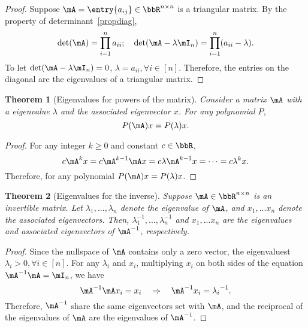 \documentclass[11pt]{article}
\theoremstyle{plain}
\newtheorem{thm}{Theorem}[section]
\theoremstyle{definition}
\begin{document}
\begin{proof}
Suppose $\mA = \entry{a_{ij}} \in \bbR^{n \times n}$ is a triangular matrix. By the property of determinant~\ref{propdiag}, 
\[ \det(\mA) = \prod_{i=1}^n a_{ii}  ; \quad \det(\mA - \lambda \mI_n) = \prod_{i=1}^n (a_{ii}-\lambda). \]
To let $\det(\mA - \lambda \mI_n) = 0$, $\lambda = a_{ii}, \forall i\in[n]$. Therefore, the entries on the diagonal are the eigenvalues of a triangular matrix.
\end{proof}

\begin{thm}[Eigenvalues for powers of the matrix]
	Consider a matrix $\mA$ with a eigenvalue $\lambda$ and the associated eigenvector $x$. For any polynomial $P$, 
	\[ P(\mA) x = P(\lambda) x. \]
\end{thm}
\begin{proof}
	For any integer $k \geq 0$ and constant $c \in \bbR$,
	\[ c\mA^k x = c\mA^{k-1} \mA x= c\lambda \mA^{k-1} x = \cdots = c\lambda^k x.\]
	Therefore, for any polynomial $P(\mA)x = P(\lambda)x$.
\end{proof}

\begin{thm}[Eigenvalues for the inverse]
Suppose $\mA \in \bbR^{n \times n}$ is an invertible matrix. Let $\lambda_1,...,\lambda_n$ denote the eigenvalue of $\mA$, and $x_1,...x_n$ denote the associated eigenvectors. Then,  $\lambda_1^{-1},...,\lambda_n^{-1}$ and $x_1,...x_n$ are the eigenvalues and associated eigenvectors of $\mA^{-1}$, respectively.
\end{thm}

\begin{proof}
	Since the nullspace of $\mA$ contains only a zero vector, the eigenvaluest $\lambda_i >0,  \forall i \in [n]$. For any $\lambda_i$ and $x_i$, multiplying $x_i$ on both sides of the equation $\mA^{-1} \mA = \mI_n$, we have 
	\[ \mA^{-1} \mA x_i = x_i \quad \Rightarrow\quad  \mA^{-1} x_i = {\lambda_i}^{-1}.  \]
	Therefore, $\mA^{-1}$ share the same eigenvectors set with $\mA$, and the reciprocal of the eigenvalues of $\mA$ are the eigenvalues of $\mA^{-1}$.
\end{proof}
\end{document}
